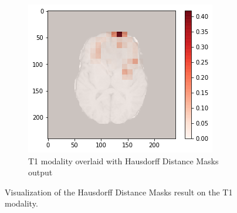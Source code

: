 \begin{figure}[H]
\begin{subfigure}[t]{.315\textwidth}
    \end{subfigure}\hfill%
    \begin{subfigure}[t]{.315\textwidth}
        \centering
        \includegraphics[width=\linewidth]{chapters/07_brats3d/images/09_t1_hdm10.png}
        \caption{T1 modality overlaid with Hausdorff Distance Masks output}
    \end{subfigure}
    \caption{Visualization of the Hausdorff Distance Masks result on the T1 modality.}
    \label{brats3d_t1}
\end{figure}

